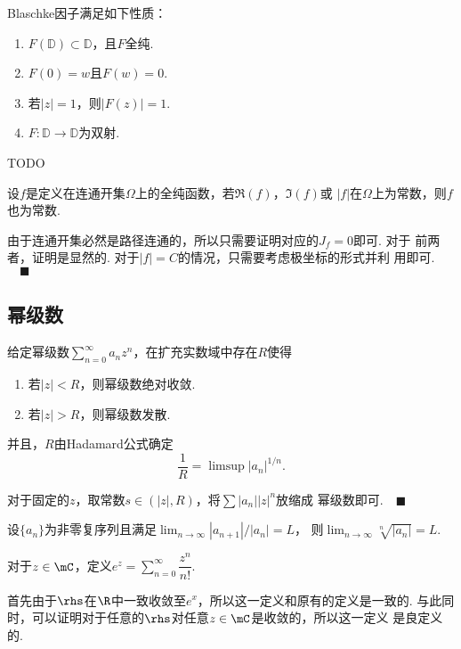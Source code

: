   \begin{thm}[Blaschke因子]
    Blaschke因子满足如下性质：
    \begin{enumerate}
      \item $F(\mathbb{D})\subset\mathbb{D}$，且$F$全纯.
      \item $F(0)=w$且$F(w)=0$.
      \item 若$|z|=1$，则$|F(z)|=1$.
      \item $F:\mathbb{D}\to\mathbb{D}$为双射.
    \end{enumerate}
  \end{thm}
  \proof
    TODO

  \begin{pos}[常数]
    设$f$是定义在连通开集$\Omega$上的全纯函数，若$\Re(f)$，$\Im(f)$或
    $|f|$在$\Omega$上为常数，则$f$也为常数.
  \end{pos}
  \proof
    由于连通开集必然是路径连通的，所以只需要证明对应的$J_f=0$即可. 对于
    前两者，证明是显然的. 对于$|f|=C$的情况，只需要考虑极坐标的形式并利
    用即可.$\quad\blacksquare$

\subsection{幂级数}

  \begin{thm}[幂级数收敛半径]
    给定幂级数$\sum_{n=0}^\infty a_nz^n$，在扩充实数域中存在$R$使得
    \begin{enumerate}
      \item 若$|z|<R$，则幂级数绝对收敛.
      \item 若$|z|>R$，则幂级数发散.
    \end{enumerate}
    并且，$R$由Hadamard公式确定
    \[
      \frac{1}{R} = \limsup|a_n|^{1/n}.
    \]
  \end{thm}
  \proof
    对于固定的$z$，取常数$s\in(|z|, R)$，将$\sum|a_n||z|^n$放缩成
    幂级数即可.$\quad\blacksquare$

  \begin{thm}
    设$\{a_n\}$为非零复序列且满足$\lim_{n\to\infty}|a_{n+1}|/|a_n|=L$，
    则$\lim_{n\to\infty}\sqrt[n]{|a_n|}=L$.
  \end{thm}

  \begin{defi}[指数函数]
    \label{defi: 指数函数}
    对于$z\in\mC$，定义$e^z = \sum\limits_{n=0}^\infty\dfrac{z^n}{n!}$.
  \end{defi}
  \remark
    首先由于$\rhs$在$\R$中一致收敛至$e^x$，所以这一定义和原有的定义是一致的.
    与此同时，可以证明对于任意的$\rhs$对任意$z\in\mC$是收敛的，所以这一定义
    是良定义的.


